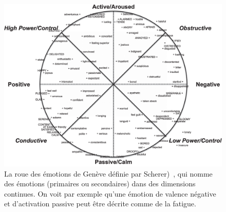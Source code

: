\begin{figure}
  \centering
  \includegraphics[width=14cm]{./Chapitre1/figures/Genova.png}
  \caption{La roue des émotions de Genève définie par Scherer)~\cite{Scherer2005}, qui nomme des émotions (primaires ou secondaires) dans des dimensions continues. On voit par exemple qu'une émotion de valence négative et d'activation passive peut être décrite comme de la fatigue.}
  \label{fig:Genova}
\end{figure}
